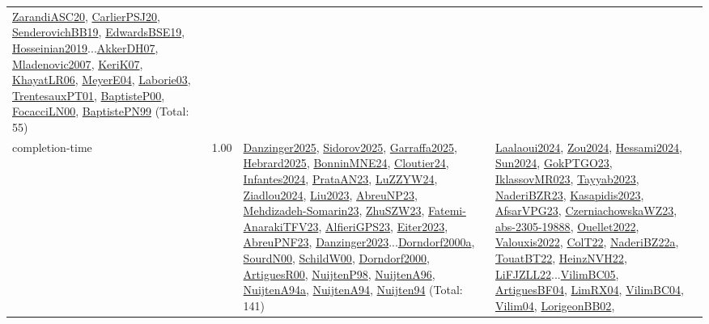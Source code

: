 {\begin{longtable}{p{3cm}r>{\raggedright\arraybackslash}p{6cm}>{\raggedright\arraybackslash}p{6cm}>{\raggedright\arraybackslash}p{8cm}}
\hyperref[detail:ZarandiASC20]{ZarandiASC20}, \hyperref[detail:CarlierPSJ20]{CarlierPSJ20}, \hyperref[detail:SenderovichBB19]{SenderovichBB19}, \hyperref[detail:EdwardsBSE19]{EdwardsBSE19}, \hyperref[detail:Hosseinian2019]{Hosseinian2019}...\hyperref[detail:AkkerDH07]{AkkerDH07}, \hyperref[detail:Mladenovic2007]{Mladenovic2007}, \hyperref[detail:KeriK07]{KeriK07}, \hyperref[detail:KhayatLR06]{KhayatLR06}, \hyperref[detail:MeyerE04]{MeyerE04}, \hyperref[detail:Laborie03]{Laborie03}, \hyperref[detail:TrentesauxPT01]{TrentesauxPT01}, \hyperref[detail:BaptisteP00]{BaptisteP00}, \hyperref[detail:FocacciLN00]{FocacciLN00}, \hyperref[detail:BaptistePN99]{BaptistePN99} (Total: 55)\\
\index{completion-time}\index{Concepts!completion-time}completion-time &  1.00 & \hyperref[detail:Danzinger2025]{Danzinger2025}, \hyperref[detail:Sidorov2025]{Sidorov2025}, \hyperref[detail:Garraffa2025]{Garraffa2025}, \hyperref[detail:Hebrard2025]{Hebrard2025}, \hyperref[detail:BonninMNE24]{BonninMNE24}, \hyperref[detail:Cloutier24]{Cloutier24}, \hyperref[detail:Infantes2024]{Infantes2024}, \hyperref[detail:PrataAN23]{PrataAN23}, \hyperref[detail:LuZZYW24]{LuZZYW24}, \hyperref[detail:Ziadlou2024]{Ziadlou2024}, \hyperref[detail:Liu2023]{Liu2023}, \hyperref[detail:AbreuNP23]{AbreuNP23}, \hyperref[detail:Mehdizadeh-Somarin23]{Mehdizadeh-Somarin23}, \hyperref[detail:ZhuSZW23]{ZhuSZW23}, \hyperref[detail:Fatemi-AnarakiTFV23]{Fatemi-AnarakiTFV23}, \hyperref[detail:AlfieriGPS23]{AlfieriGPS23}, \hyperref[detail:Eiter2023]{Eiter2023}, \hyperref[detail:AbreuPNF23]{AbreuPNF23}, \hyperref[detail:Danzinger2023]{Danzinger2023}...\hyperref[detail:Dorndorf2000a]{Dorndorf2000a}, \hyperref[detail:SourdN00]{SourdN00}, \hyperref[detail:SchildW00]{SchildW00}, \hyperref[detail:Dorndorf2000]{Dorndorf2000}, \hyperref[detail:ArtiguesR00]{ArtiguesR00}, \hyperref[detail:NuijtenP98]{NuijtenP98}, \hyperref[detail:NuijtenA96]{NuijtenA96}, \hyperref[detail:NuijtenA94a]{NuijtenA94a}, \hyperref[detail:NuijtenA94]{NuijtenA94}, \hyperref[detail:Nuijten94]{Nuijten94} (Total: 141) & \hyperref[detail:Laalaoui2024]{Laalaoui2024}, \hyperref[detail:Zou2024]{Zou2024}, \hyperref[detail:Hessami2024]{Hessami2024}, \hyperref[detail:Sun2024]{Sun2024}, \hyperref[detail:GokPTGO23]{GokPTGO23}, \hyperref[detail:IklassovMR023]{IklassovMR023}, \hyperref[detail:Tayyab2023]{Tayyab2023}, \hyperref[detail:NaderiBZR23]{NaderiBZR23}, \hyperref[detail:Kasapidis2023]{Kasapidis2023}, \hyperref[detail:AfsarVPG23]{AfsarVPG23}, \hyperref[detail:CzerniachowskaWZ23]{CzerniachowskaWZ23}, \hyperref[detail:abs-2305-19888]{abs-2305-19888}, \hyperref[detail:Ouellet2022]{Ouellet2022}, \hyperref[detail:Valouxis2022]{Valouxis2022}, \hyperref[detail:ColT22]{ColT22}, \hyperref[detail:NaderiBZ22a]{NaderiBZ22a}, \hyperref[detail:TouatBT22]{TouatBT22}, \hyperref[detail:HeinzNVH22]{HeinzNVH22}, \hyperref[detail:LiFJZLL22]{LiFJZLL22}...\hyperref[detail:VilimBC05]{VilimBC05}, \hyperref[detail:ArtiguesBF04]{ArtiguesBF04}, \hyperref[detail:LimRX04]{LimRX04}, \hyperref[detail:VilimBC04]{VilimBC04}, \hyperref[detail:Vilim04]{Vilim04}, \hyperref[detail:LorigeonBB02]{LorigeonBB02}, 
\end{longtable}}
